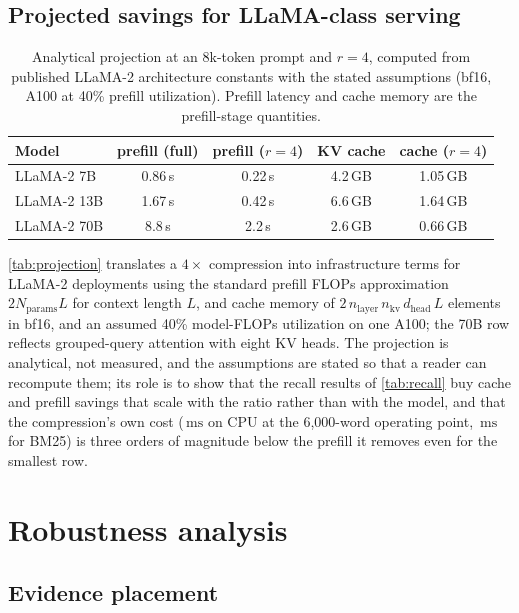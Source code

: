 \documentclass[pdflatex,sn-basic]{sn-jnl}
\theoremstyle{remark}
\newcommand{\ms}{\ensuremath{\mathrm{ms}}}
\begin{document}
\subsection{Projected savings for LLaMA-class serving}
\label{sec:projection}

\begin{table}[t]
\centering
\caption{Analytical projection at an 8k-token prompt and $r=4$,
computed from published LLaMA-2 architecture constants with the
stated assumptions (bf16, A100 at 40\% prefill utilization). Prefill
latency and cache memory are the prefill-stage quantities.}
\label{tab:projection}
\small
\begin{tabular}{lcccc}
\toprule
Model & prefill (full) & prefill ($r=4$) & KV cache & cache ($r=4$) \\
\midrule
LLaMA-2 7B & 0.86\,s & 0.22\,s & 4.2\,GB & 1.05\,GB \\
LLaMA-2 13B & 1.67\,s & 0.42\,s & 6.6\,GB & 1.64\,GB \\
LLaMA-2 70B & 8.8\,s & 2.2\,s & 2.6\,GB & 0.66\,GB \\
\bottomrule
\end{tabular}
\end{table}

\autoref{tab:projection} translates a $4\times$ compression into
infrastructure terms for LLaMA-2 deployments \citep{touvron2023llama}
using the standard prefill FLOPs approximation $2N_{\mathrm{params}}
L$ for context length $L$, and cache memory of
$2\,n_{\mathrm{layer}}\,n_{\mathrm{kv}}\,d_{\mathrm{head}}\,L$
elements in bf16, and an assumed 40\% model-FLOPs utilization on one
A100; the 70B row reflects grouped-query attention with eight KV
heads. The projection is analytical, not measured, and the
assumptions are stated so that a reader can recompute them; its role
is to show that the recall results of \autoref{tab:recall} buy cache
and prefill savings that scale with the ratio rather than with the
model, and that the compression's own cost (\TimeSieSixk\,\ms{} on
CPU at the 6{,}000-word operating point, \TimeBmSixk\,\ms{} for BM25)
is three orders of magnitude below the prefill it removes even for
the smallest row.

\section{Robustness analysis}
\label{sec:robustness}

\subsection{Evidence placement}
\label{sec:placement}
\end{document}
